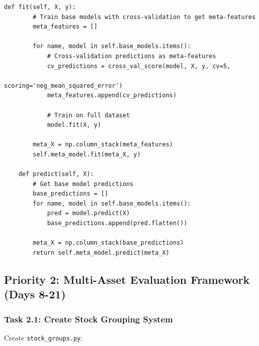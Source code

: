 \documentclass[11pt]{article}
\begin{document}
\begin{lstlisting}[style=pythonstyle, caption=Ensemble Baseline Methods]
    def fit(self, X, y):
        # Train base models with cross-validation to get meta-features
        meta_features = []
        
        for name, model in self.base_models.items():
            # Cross-validation predictions as meta-features
            cv_predictions = cross_val_score(model, X, y, cv=5, 
                                           scoring='neg_mean_squared_error')
            meta_features.append(cv_predictions)
            
            # Train on full dataset
            model.fit(X, y)
            
        meta_X = np.column_stack(meta_features)
        self.meta_model.fit(meta_X, y)
        
    def predict(self, X):
        # Get base model predictions
        base_predictions = []
        for name, model in self.base_models.items():
            pred = model.predict(X)
            base_predictions.append(pred.flatten())
            
        meta_X = np.column_stack(base_predictions)
        return self.meta_model.predict(meta_X)
\end{lstlisting}

\subsection{Priority 2: Multi-Asset Evaluation Framework (Days 8-21)}

\subsubsection{Task 2.1: Create Stock Grouping System}

Create \texttt{stock\_groups.py}:
\end{document}
